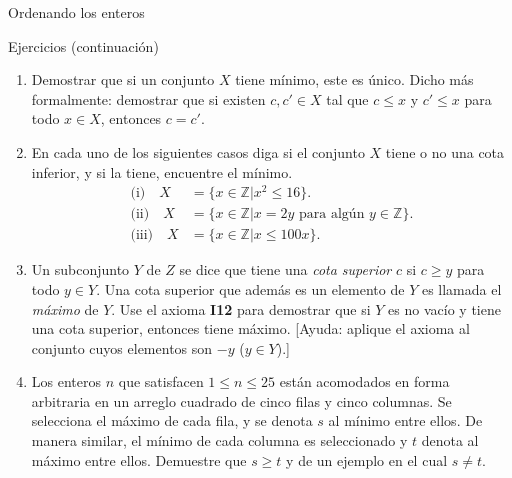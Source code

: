 \documentclass[11pt,spanish,makeidx]{amsbook}
\theoremstyle{definition}
\theoremstyle{remark}
\begin{document}
\begin{section}{Ordenando los enteros}
\begin{subsection}{Ejercicios} {\rm (continuación)}
\begin{enumerate}
\item Demostrar que si un conjunto $X$ tiene mínimo, este es único. Dicho más formalmente: demostrar que si existen $c,c' \in X$ tal que  $c\le x$ y $c'\le x$ para todo $x \in X$, entonces $c=c'$. 
\item En cada uno de los siguientes casos diga si el conjunto $X$ tiene o no una cota inferior, y si la tiene, encuentre el mínimo.
$$
\begin{aligned}
\text{(i)}\quad X &=\{x \in \mathbb Z | x^2\le 16\}. \\
\text{(ii)}\quad X &=\{x \in \mathbb Z | x=2y \text{\ para algún }
y \in
\mathbb Z\}. \\
\text{(iii)}\quad X &=\{x \in \mathbb Z | x\le 100x\} .
\end{aligned}
$$
\item Un subconjunto $Y$ de $Z$ se dice que tiene una {\em cota superior} $c$ si $c\ge y$ para todo $y \in Y$. Una cota superior que además es un elemento de $Y$ es llamada el {\em máximo} de $Y$. Use el axioma {\bf I12} para demostrar que si $Y$ es no vacío y tiene una cota superior, entonces tiene máximo. [Ayuda: aplique el axioma al conjunto cuyos elementos son $-y$ ($y \in Y$).] 
\item Los enteros $n$ que satisfacen $1 \le n \le 25$ están acomodados en forma arbitraria en un arreglo cuadrado de cinco filas y cinco columnas. Se selecciona el máximo  de cada fila, y se denota $s$ al mínimo entre ellos. De manera similar, el mínimo de cada columna es seleccionado y $t$ denota al máximo entre ellos. Demuestre que $s\ge t$ y de un ejemplo en el cual $s\not=t$.
\end{enumerate}
\end{subsection}

\end{section}
\end{document}

